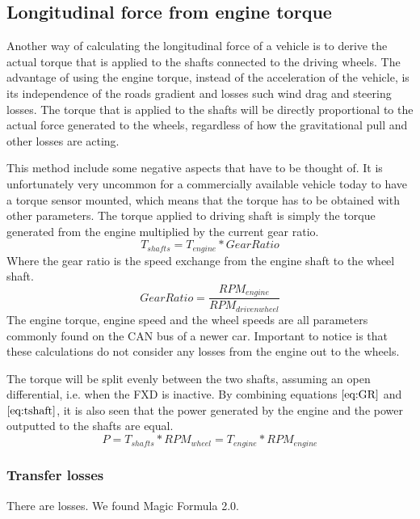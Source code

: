 \subsection{Longitudinal force from engine torque}

Another way of calculating the longitudinal force of a vehicle is to derive the actual torque that is applied to the shafts connected to the driving wheels. The advantage of using the engine torque, instead of the acceleration of the vehicle, is its independence of the roads gradient and losses such wind drag and steering losses. The torque that is applied to the shafts will be directly proportional to the actual force generated to the wheels, regardless of how the gravitational pull and other losses are acting. 

This method include some negative aspects that have to be thought of. It is unfortunately very uncommon for a commercially available vehicle today to have a torque sensor mounted, which means that the torque has to be obtained with other parameters. The torque applied to driving shaft is simply the torque generated from the engine multiplied by the current gear ratio. 
\begin{equation}
\label{eq:tshaft}
T_{shafts} = T_{engine}*Gear Ratio
\end{equation}
Where the gear ratio is the speed exchange from the engine shaft to the wheel shaft.
\begin{equation}
\label{eq:GR}
Gear Ratio = \frac{RPM_{engine}}{RPM_{drivenwheel}}
\end{equation}
The engine torque, engine speed and the wheel speeds are all parameters commonly found on the CAN bus of a newer car. Important to notice is that these calculations do not consider any losses from the engine out to the wheels.

The torque will be split evenly between the two shafts, assuming an open differential, i.e. when the FXD is inactive. By combining equations $ \ref{eq:GR} $ and $ \ref{eq:tshaft} $, it is also seen that the power generated by the engine and the power outputted to the shafts are equal.
\begin{equation}
	P = T_{shafts}*RPM_{wheel} = T_{engine}*RPM_{engine}
\end{equation}

\subsubsection{Transfer losses}
There are losses. We found Magic Formula 2.0.



